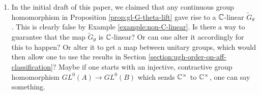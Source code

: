 \documentclass[12pt]{amsart}
\begin{document}
\begin{enumerate}
\item In the initial draft of this paper, we claimed that any continuous group homomorphism in Proposition \ref{prop:gl-G-theta-lift} gave rise to a $\mathbb{C}$-linear $\tilde{G}_\theta$. This is clearly false by Example \ref{example:non-C-linear}. Is there a way to guarantee that the map $\tilde{G}_\theta$ is $\mathbb{C}$-linear? Or can one alter it accordingly for this to happen? Or alter it to get a map between unitary groups, which would then allow one to use the results in Section \ref{section:ugh-order-on-aff-classification}? Maybe if one starts with an injective, contractive group homomorphism $GL^0(A) \to GL^0(B)$ which sends $\mathbb{C}^\times$ to $\mathbb{C}^\times$, one can say something. 
\end{enumerate}



  
  
\end{document}
